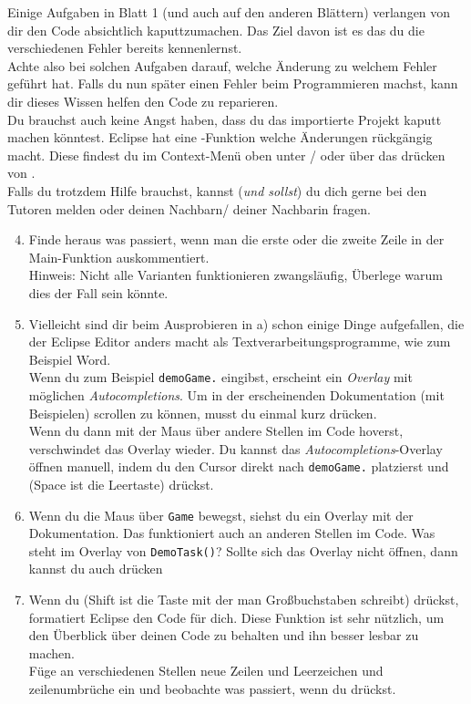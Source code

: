 \begin{Infobox}[Fehler]
    Einige Aufgaben in Blatt 1 (und auch auf den anderen Blättern) verlangen von dir den Code absichtlich kaputtzumachen.
    Das Ziel davon ist es das du die verschiedenen Fehler bereits kennenlernst.\\
    Achte also bei solchen Aufgaben darauf, welche Änderung zu welchem Fehler geführt hat.
    Falls du nun später einen Fehler beim Programmieren machst, kann dir dieses Wissen helfen den Code zu reparieren.\\
    Du brauchst auch keine Angst haben, dass du das importierte Projekt kaputt machen könntest.
    Eclipse hat eine -Funktion welche Änderungen rückgängig macht.
    Diese findest du im Context-Menü oben unter / oder über das drücken von .\\
    Falls du trotzdem Hilfe brauchst, kannst (\emph{und sollst}) du dich gerne bei den Tutoren melden oder deinen Nachbarn/ deiner Nachbarin fragen.
\end{Infobox}


\begin{enumerate} \setcounter{enumi}{3}
\item Finde heraus was passiert, wenn man die erste oder die zweite Zeile in der Main-Funktion auskommentiert.\\
Hinweis: Nicht alle Varianten funktionieren zwangsläufig, Überlege warum dies der Fall sein könnte.
\item Vielleicht sind dir beim Ausprobieren in a) schon einige Dinge aufgefallen, die der Eclipse Editor anders macht als Textverarbeitungsprogramme, wie zum Beispiel Word.\\
Wenn du zum Beispiel \lstinline{demoGame.} eingibst, erscheint ein \textit{Overlay} mit möglichen \textit{Autocompletions}. Um in der erscheinenden Dokumentation (mit Beispielen) scrollen zu können, musst du einmal kurz  drücken.\\
Wenn du dann mit der Maus über andere Stellen im Code hoverst, verschwindet das Overlay wieder.
Du kannst das \textit{Autocompletions}-Overlay öffnen manuell, indem du den Cursor direkt nach \lstinline{demoGame.} platzierst und  (Space ist die Leertaste) drückst.
\item
Wenn du die Maus über \lstinline{Game} bewegst, siehst du ein Overlay mit der Dokumentation.
Das funktioniert auch an anderen Stellen im Code.
Was steht im Overlay von \lstinline{DemoTask()}? Sollte sich das Overlay nicht öffnen, dann kannst du auch  drücken
\item
Wenn du  (Shift ist die Taste mit der man Großbuchstaben schreibt) drückst, formatiert Eclipse den Code für dich. Diese Funktion ist sehr nützlich, um den Überblick über deinen Code zu behalten und ihn besser lesbar zu machen.\\
Füge an verschiedenen Stellen neue Zeilen und Leerzeichen und zeilenumbrüche ein und beobachte was passiert, wenn du  drückst.
\end{enumerate}


